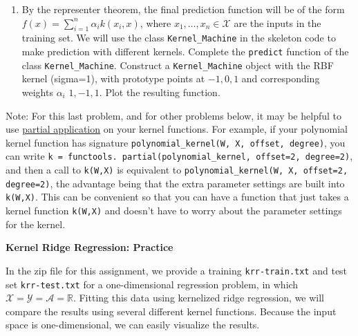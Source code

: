 \documentclass{article}
\newcommand{\nyuparagrah}[1]{\textcolor{nyupurple}{\large #1}}
\theoremstyle{plain}
\theoremstyle{definition}
\begin{document}
\begin{enumerate}
\item By the representer theorem, the final prediction function will be
of the form $f(x)=\sum_{i=1}^{n}\alpha_{i}k(x_{i},x)$, where $x_{1},\ldots,x_{n}\in\mathcal{X}$
are the inputs in the training set. 
We will use the class \texttt{Kernel\_Machine} in the skeleton code to make prediction with different kernels.
Complete the \texttt{predict} function
of the class \texttt{Kernel\_Machine}. Construct
a \texttt{Kernel\_Machine} object with the RBF kernel (sigma=1), with
prototype points at $-1,0,1$ and corresponding weights $\alpha_i$ $1,-1,1$.
Plot the resulting function.\\
\setcounter{saveenum}{\value{enumi}}
\end{enumerate}

Note: For this last problem, and for other problems below, it may be helpful
to use \href{https://en.wikipedia.org/wiki/Partial_application}{partial application}
on your kernel functions. For example, if your polynomial kernel function
has signature \texttt{polynomial\_kernel(W, X, offset, degree)}, you
can write \texttt{k = functools. partial(polynomial\_kernel, offset=2,
degree=2)}, and then a call to \texttt{k(W,X)} is equivalent to \texttt{polynomial\_kernel(W,
X, offset=2, degree=2)}, the advantage being that the extra parameter
settings are built into \texttt{k(W,X)}. This can be convenient so
that you can have a function that just takes a kernel function \texttt{k(W,X)}
and doesn't have to worry about the parameter settings for the kernel.

\nyuparagrah{\bf Kernel Ridge Regression: Practice}

In the zip file for this assignment, we provide a training \texttt{krr-train.txt} and test
set \texttt{krr-test.txt} for a one-dimensional
regression problem, in which $\mathcal{X}=\mathcal{Y}=\mathcal{A}=\mathbb{R}$. Fitting this
data using kernelized ridge regression, we will compare the results
using several different kernel functions. Because the input space
is one-dimensional, we can easily visualize the results.
\end{document}
